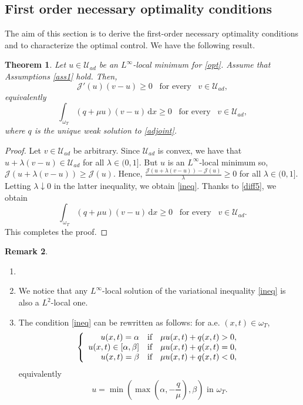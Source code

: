 \documentclass[reqno,twoside]{amsart}
\numberwithin{equation}{section}
\newtheorem{theorem}{Theorem}[section]
\theoremstyle{definition}
\newtheorem{remark}[theorem]{Remark}
\numberwithin{equation}{section}
\def \dis {\displaystyle}
\def \U {{\mathcal U}}
\def \dx{\mathrm{d}x}
\def \U {\mathcal{U}}
\begin{document}
\subsection{First order necessary optimality conditions}
The aim of this section is to derive the first-order necessary optimality conditions and to characterize the optimal control. We have the following result.
\begin{theorem}\label{theoSO}
Let $u\in\mathcal U_{ad}$ be an $L^\infty$-local minimum for \eqref{opt}. Assume that Assumptions \ref{ass1} hold. Then,
\begin{equation}\label{ineq}
	\mathcal{J}'(u)(v-u)\geq 0\;\;\;\text{for every}\;\;\; v\in \U_{ad},
\end{equation}
equivalently	
\begin{equation}\label{ineq1}
	\int_{\omega_T}(q+\mu u)(v-u)\,\dx\geq 0\;\;\;\text{for every}\;\;\; v\in \U_{ad},
\end{equation}
where $q$ is the unique weak solution to \eqref{adjoint}.
\end{theorem}
\begin{proof}
Let $v\in \U_{ad}$ be arbitrary. Since $\U_{ad}$ is convex,  we have that $u+\lambda(v-u)\in \U_{ad}$ for all $\lambda\in (0,1]$. But $u$ is an $L^\infty$-local minimum so, $\mathcal{J}(u+\lambda(v-u))\geq \mathcal{J}(u)$. Hence,
$\dis\frac{\mathcal{J}(u+\lambda(v-u))-\mathcal{J}(u)}{\lambda}\geq 0$ for all $\lambda\in (0,1].$
Letting $\lambda\downarrow 0$ in the latter inequality, we obtain 	\eqref{ineq}. Thanks to \eqref{diff5}, we obtain
$$
\dis\int_{\omega_T}(q+\mu u)(v-u)\,\dx\geq 0\;\;\;\text{for every}\;\;\; v\in \U_{ad}.$$
This completes the proof.
\end{proof}
\begin{remark}
\begin{enumerate}
	\item[ $ $]
	\item 	We notice that any $L^\infty$-local solution of the variational inequality \eqref{ineq} is also a $L^2$-local one.
	\item 	The condition \eqref{ineq} can be rewritten as follows:  for a.e. $(x,t)\in \omega_T$,
	\begin{equation}\label{contr1vac}
		\dis \left\{\begin{array}{rlllll}
			u(x,t)=\alpha&\hbox{if}&\mu u(x,t)+q(x,t)>0,\\
			u(x,t)\in [\alpha,\beta] &\hbox{if}&\mu u(x,t)+q(x,t)=0,\\
			u(x,t)=\beta&\hbox{if}&\mu u(x,t)+q(x,t)<0,
		\end{array}
		\right.
	\end{equation}
	equivalently
	\begin{equation}\label{contr1}
		u=\min\left(\max\left(\alpha,-\frac{q}{\mu}\right),\beta\right) \text{ in }\omega_T.
	\end{equation}
\end{enumerate}
\end{remark}	
\end{document}

